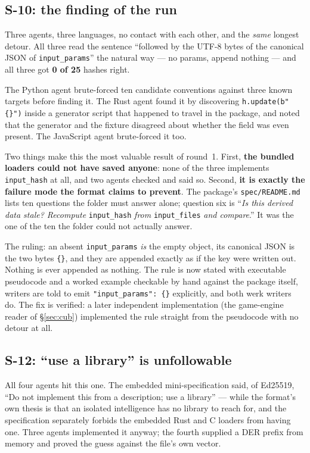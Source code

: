 \documentclass[10pt,twocolumn,letterpaper]{article}
\newcommand{\code}[1]{\texttt{\small #1}}
\begin{document}
\subsection{S-10: the finding of the run}

Three agents, three languages, no contact with each other, and the \emph{same}
longest detour. All three read the sentence ``followed by the UTF-8 bytes of the
canonical JSON of \code{input\_params}'' the natural way --- no params, append
nothing --- and all three got \textbf{0 of 25} hashes right.

The Python agent brute-forced ten candidate conventions against three known
targets before finding it. The Rust agent found it by discovering
\code{h.update(b"\{\}")} inside a generator script that happened to travel in the
package, and noted that the generator and the fixture disagreed about whether the
field was even present. The JavaScript agent brute-forced it too.

Two things make this the most valuable result of round~1. First, \textbf{the
bundled loaders could not have saved anyone}: none of the three implements
\code{input\_hash} at all, and two agents checked and said so. Second, \textbf{it
is exactly the failure mode the format claims to prevent}. The package's
\code{spec/README.md} lists ten questions the folder must answer alone; question
six is ``\emph{Is this derived data stale? Recompute} \code{input\_hash} \emph{from}
\code{input\_files} \emph{and compare}.'' It was the one of the ten the folder
could not actually answer.

The ruling: an absent \code{input\_params} \emph{is} the empty object, its
canonical JSON is the two bytes \code{\{\}}, and they are appended exactly as if
the key were written out. Nothing is ever appended as nothing. The rule is now
stated with executable pseudocode and a worked example checkable by hand against
the package itself, writers are told to emit \code{"input\_params": \{\}}
explicitly, and both werk writers do. The fix is verified: a later independent
implementation (the game-engine reader of \S\ref{sec:cub}) implemented the rule
straight from the pseudocode with no detour at all.

\subsection{S-12: ``use a library'' is unfollowable}

All four agents hit this one. The embedded mini-specification said, of Ed25519,
``Do not implement this from a description; use a library'' --- while the format's
own thesis is that an isolated intelligence has no library to reach for, and the
specification separately forbids the embedded Rust and C loaders from having one.
Three agents implemented it anyway; the fourth supplied a DER prefix from memory
and proved the guess against the file's own vector.
\end{document}
